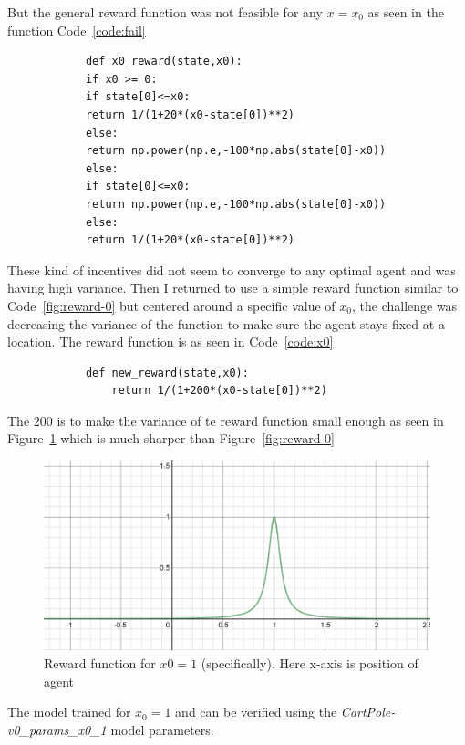 \documentclass[a4paper]{article}
\newenvironment{code}{\captionsetup{type=listing}}{}
\begin{document}
    But the general reward function was not feasible for any $x=x_0$ as seen in the function Code~\ref{code:fail}
    \begin{code}
        \label{code:fail}
        \begin{verbatim}
            def x0_reward(state,x0):
            if x0 >= 0:
            if state[0]<=x0:
            return 1/(1+20*(x0-state[0])**2)
            else:
            return np.power(np.e,-100*np.abs(state[0]-x0))
            else:
            if state[0]<=x0:
            return np.power(np.e,-100*np.abs(state[0]-x0))
            else:
            return 1/(1+20*(x0-state[0])**2)
        \end{verbatim}
    \end{code}
    These kind of incentives did not seem to converge to any optimal agent and was having high variance. Then I returned to use a simple reward function similar to Code~\ref{fig:reward-0} but centered around a specific value of $x_{0}$, the challenge was decreasing the variance of the function to make sure the agent stays fixed at a location. The reward function is as seen in Code~\ref{code:x0}
    \begin{code}
        \label{code:x0}
        \begin{verbatim}
            def new_reward(state,x0):
                return 1/(1+200*(x0-state[0])**2)
        \end{verbatim}
    \end{code}
    The $200$ is to make the variance of te reward function small enough as seen in Figure~\ref{fig:x0-1} which is much sharper than Figure~\ref{fig:reward-0}
    \begin{figure}[ht!]
        \centering
        \includegraphics[width=\textwidth]{x0.PNG}
        \caption{Reward function for $x0=1$ (specifically). Here x-axis is position of agent}
        \label{fig:x0-1}
    \end{figure}
    The model trained for $x_0=1$ and can be verified using the \textit{CartPole-v0\_params\_x0\_1} model parameters.
\end{document}
